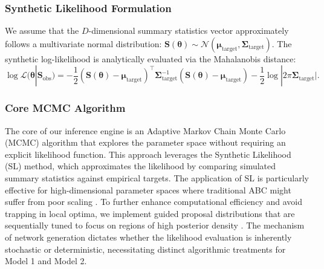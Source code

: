 \subsubsection{Synthetic Likelihood Formulation}
We assume that the $D$-dimensional summary statistics vector approximately follows a multivariate normal distribution: $\mathbf{S}(\boldsymbol{\theta}) \sim \mathcal{N}(\boldsymbol{\mu}_{\text{target}}, \boldsymbol{\Sigma}_{\text{target}})$. The synthetic log-likelihood is analytically evaluated via the Mahalanobis distance:
\begin{equation} \label{eq:synthetic_loglik}
    \log \mathcal{L}(\boldsymbol{\theta} | \mathbf{S}_{\text{obs}}) = -\frac{1}{2} (\mathbf{S}(\boldsymbol{\theta}) - \boldsymbol{\mu}_{\text{target}})^\top \boldsymbol{\Sigma}_{\text{target}}^{-1} (\mathbf{S}(\boldsymbol{\theta}) - \boldsymbol{\mu}_{\text{target}}) - \frac{1}{2} \log |2\pi \boldsymbol{\Sigma}_{\text{target}}|.
\end{equation}




\subsubsection{Core MCMC Algorithm}
\label{sec:core_mcmc}

The core of our inference engine is an Adaptive Markov Chain Monte Carlo (MCMC) algorithm that explores the parameter space without requiring an explicit likelihood function.
This approach leverages the Synthetic Likelihood (SL) method, which approximates the likelihood by comparing simulated summary statistics against empirical targets.
The application of SL is particularly effective for high-dimensional parameter spaces where traditional ABC might suffer from poor scaling \parencite{ong2018likelihoodfree}.
To further enhance computational efficiency and avoid trapping in local optima, we implement guided proposal distributions that are sequentially tuned to focus on regions of high posterior density \parencite{picchini2023sequentially}.
The mechanism of network generation dictates whether the likelihood evaluation is inherently stochastic or deterministic, necessitating distinct algorithmic treatments for Model 1 and Model 2.

